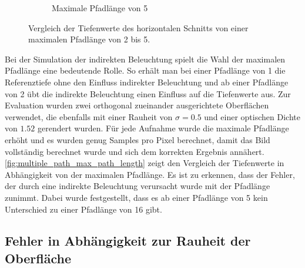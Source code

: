 \documentclass[thesis.tex]{subfiles}
\begin{document}
\begin{figure}[h!]
\begin{subfigure}{0.49\textwidth}
\caption{Maximale Pfadlänge von 5}
\end{subfigure}
\caption{Vergleich der Tiefenwerte des horizontalen Schnitts von einer maximalen Pfadlänge von 2 bis 5.}
\label{fig:multiple_path_max_path_length}
\end{figure}

Bei der Simulation der indirekten Beleuchtung spielt die Wahl der maximalen Pfadlänge eine bedeutende Rolle. So erhält man bei einer Pfadlänge von 1 die Referenztiefe ohne den Einfluss indirekter Beleuchtung und ab einer Pfadlänge von 2 übt die indirekte Beleuchtung einen Einfluss auf die Tiefenwerte aus. Zur Evaluation wurden zwei orthogonal zueinander ausgerichtete Oberflächen verwendet, die ebenfalls mit einer Rauheit von $\sigma = 0.5$ und einer optischen Dichte von $1.52$ gerendert wurden. Für jede Aufnahme wurde die maximale Pfadlänge erhöht und es wurden genug Samples pro Pixel berechnet, damit das Bild vollständig berechnet wurde und sich dem korrekten Ergebnis annähert. \autoref{fig:multiple_path_max_path_length} zeigt den Vergleich der Tiefenwerte in Abhängigkeit von der maximalen Pfadlänge. Es ist zu erkennen, dass der Fehler, der durch eine indirekte Beleuchtung verursacht wurde mit der Pfadlänge zunimmt. Dabei wurde festgestellt, dass es ab einer Pfadlänge von 5 kein Unterschied zu einer Pfadlänge von 16 gibt.

\subsection{Fehler in Abhängigkeit zur Rauheit der Oberfläche}
\end{document}
